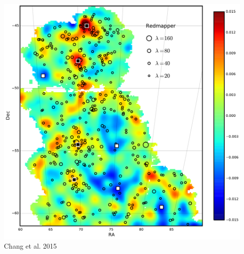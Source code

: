 \documentclass{beamer}
\begin{document}
{\begin{columns}
\begin{column}{0.4\textwidth}
\begin{itemize}
            \end{itemize}
        \end{column}
        \begin{column}{0.6\textwidth}
                \centering
                \includegraphics[width=\textwidth]{cluster_overlay_ngmix_bpz.pdf}
                \newline
                {\tiny Chang et al. 2015}
        \end{column}
    \end{columns}

}
\end{document}

